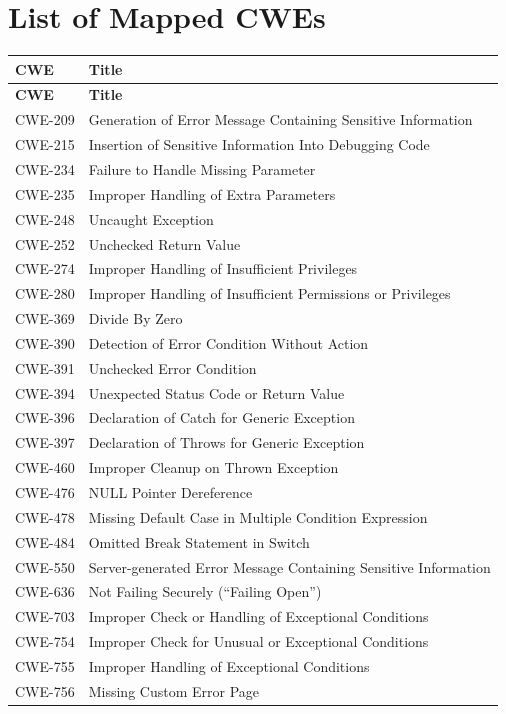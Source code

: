 \documentclass[11pt]{article}
\begin{document}
\newpage
\section{List of Mapped CWEs}
\renewcommand{\arraystretch}{1.1}
\begin{longtable}{@{}p{2.6cm}p{11.8cm}@{}}
\toprule
\textbf{CWE} & \textbf{Title} \\
\midrule
\endfirsthead
\toprule
\textbf{CWE} & \textbf{Title} \\
\midrule
\endhead
\bottomrule
\endfoot

CWE-209 & Generation of Error Message Containing Sensitive Information \\
CWE-215 & Insertion of Sensitive Information Into Debugging Code \\
CWE-234 & Failure to Handle Missing Parameter \\
CWE-235 & Improper Handling of Extra Parameters \\
CWE-248 & Uncaught Exception \\
CWE-252 & Unchecked Return Value \\
CWE-274 & Improper Handling of Insufficient Privileges \\
CWE-280 & Improper Handling of Insufficient Permissions or Privileges \\
CWE-369 & Divide By Zero \\
CWE-390 & Detection of Error Condition Without Action \\
CWE-391 & Unchecked Error Condition \\
CWE-394 & Unexpected Status Code or Return Value \\
CWE-396 & Declaration of Catch for Generic Exception \\
CWE-397 & Declaration of Throws for Generic Exception \\
CWE-460 & Improper Cleanup on Thrown Exception \\
CWE-476 & NULL Pointer Dereference \\
CWE-478 & Missing Default Case in Multiple Condition Expression \\
CWE-484 & Omitted Break Statement in Switch \\
CWE-550 & Server-generated Error Message Containing Sensitive Information \\
CWE-636 & Not Failing Securely (``Failing Open'') \\
CWE-703 & Improper Check or Handling of Exceptional Conditions \\
CWE-754 & Improper Check for Unusual or Exceptional Conditions \\
CWE-755 & Improper Handling of Exceptional Conditions \\
CWE-756 & Missing Custom Error Page \\

\end{longtable}
\end{document}

